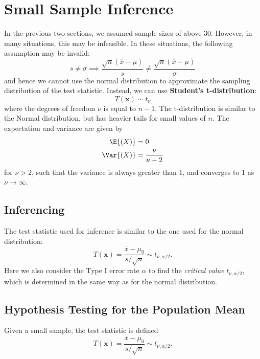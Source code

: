 \documentclass{article}
\begin{document}
\section{Small Sample Inference}
In the previous two sections, we assumed sample sizes of above 30.
However, in many situations, this may be infeasible. In these
situations, the following assumption may be invalid:
\begin{equation*}
    s \neq \sigma \implies \frac{\sqrt{n}\left( \overline{x} - \mu \right)}{s} \neq \frac{\sqrt{n}\left( \overline{x} - \mu \right)}{\sigma}
\end{equation*}
and hence we cannot use the normal distribution to approximate the
sampling distribution of the test statistic. Instead, we can use
\textbf{Student's t-distribution}:
\begin{equation*}
    T\left( \symbf{x} \right) \sim t_{\nu}
\end{equation*}
where the degrees of freedom \(\nu\) is equal to \(n - 1\). The
t-distribution is similar to the Normal distribution, but has heavier
tails for small values of \(n\). The expectation and variance are given
by
\begin{align*}
    \E{\left( X \right)}   & = 0                   \\
    \Var{\left( X \right)} & = \frac{\nu}{\nu - 2} \\
\end{align*}
for \(\nu > 2\), such that the variance is always greater than 1, and
converges to 1 as \(\nu \rightarrow \infty\).
\subsection{Inferencing}
The test statistic used for inference is similar to the one used for
the normal distribution:
\begin{equation*}
    T\left( \symbf{x} \right) = \frac{\overline{x} - \mu_0}{s / \sqrt{n}} \sim t_{\nu, \alpha/2}.
\end{equation*}
Here we also consider the Type I error rate \(\alpha\) to find the
\textit{critical value} \(t_{\nu,\alpha/2}\), which is determined in the
same way as for the normal distribution.
\subsection{Hypothesis Testing for the Population Mean}
Given a small sample, the test statistic is defined
\begin{equation*}
    T\left( \symbf{x} \right) = \frac{\overline{x} - \mu_0}{s/\sqrt{n}} \sim t_{\nu, \alpha/2}.
\end{equation*}
\end{document}
